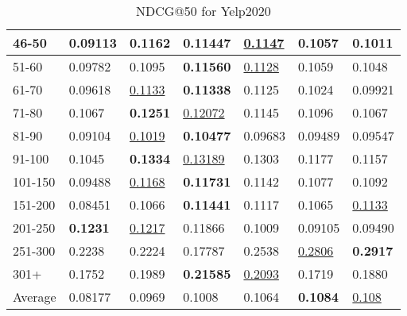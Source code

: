 \begin{table*}[]
\begin{tabular}{|l|l|l|l|l|l|l|}
    46-50   & 0.09113                        & \textbf{0.1162}                & 0.11447                        & \underline{0.1147}             & 0.1057                         & 0.1011                         \\ \hline
    51-60   & 0.09782                        & 0.1095                         & \textbf{0.11560}               & \underline{0.1128}             & 0.1059                         & 0.1048                         \\ \hline
    61-70   & 0.09618                        & \underline{0.1133}             & \textbf{0.11338}               & 0.1125                         & 0.1024                         & 0.09921                        \\ \hline
    71-80   & 0.1067                         & \textbf{0.1251}                & \underline{0.12072}            & 0.1145                         & 0.1096                         & 0.1067                         \\ \hline
    81-90   & 0.09104                        & \underline{0.1019}             & \textbf{0.10477}               & 0.09683                        & 0.09489                        & 0.09547                        \\ \hline
    91-100  & 0.1045                         & \textbf{0.1334}                & \underline{0.13189}            & 0.1303                         & 0.1177                         & 0.1157                         \\ \hline
    101-150 & 0.09488                        & \underline{0.1168}             & \textbf{0.11731}               & 0.1142                         & 0.1077                         & 0.1092                         \\ \hline
    151-200 & 0.08451                        & 0.1066                         & \textbf{0.11441}               & 0.1117                         & 0.1065                         & \underline{0.1133}             \\ \hline
    201-250 & \textbf{0.1231}                & \underline{0.1217}             & 0.11866                        & 0.1009                         & 0.09105                        & 0.09490                        \\ \hline
    251-300 & 0.2238                         & 0.2224                         & 0.17787                        & 0.2538                         & \underline{0.2806}             & \textbf{0.2917}                \\ \hline
    301+    & 0.1752                         & 0.1989                         & \textbf{0.21585}               & \underline{0.2093}             & 0.1719                         & 0.1880                         \\ \hline
    Average & 0.08177                        & 0.0969                         & 0.1008                         & 0.1064                         & \textbf{0.1084}                & \underline{0.108}                          \\ \hline
    \end{tabular}
    \caption{NDCG@50 for Yelp2020}
    \label{tab:yelp2020-ndcg-evaluation}
\end{table*}
